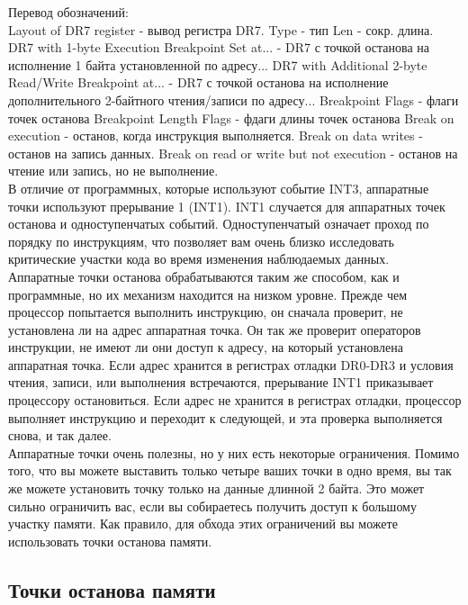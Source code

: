 \documentclass[12pt, a4paper, oneside]{book}
\begin{document}
Перевод обозначений:\\

    Layout of DR7 register - вывод регистра DR7.
    Type - тип
    Len - сокр. длина.
    DR7 with 1-byte Execution Breakpoint Set at... - DR7 с точкой останова на исполнение 1 байта установленной по адресу...
    DR7 with Additional 2-byte Read/Write Breakpoint at... - DR7 с точкой останова на исполнение дополнительного 2-байтного чтения/записи по адресу...
    Breakpoint Flags - флаги точек останова
    Breakpoint Length Flags - фдаги длины точек останова
    Break on execution - останов, когда инструкция выполняется.
    Break on data writes - останов на запись данных.
    Break on read or write but not execution - останов на чтение или запись, но не выполнение.\\


В отличие от программных, которые используют событие INT3, аппаратные точки используют прерывание 1 (INT1). INT1 случается для аппаратных точек останова и одноступенчатых событий. Одноступенчатый означает проход по порядку по инструкциям, что позволяет вам очень близко исследовать критические участки кода во время изменения наблюдаемых данных.\\

Аппаратные точки останова обрабатываются таким же способом, как и программные, но их механизм находится на низком уровне. Прежде чем процессор попытается выполнить инструкцию, он сначала проверит, не установлена ли на адрес аппаратная точка. Он так же проверит операторов инструкции, не имеют ли они доступ к адресу, на который установлена аппаратная точка. Если адрес хранится в регистрах отладки DR0-DR3 и условия чтения, записи, или выполнения встречаются, прерывание INT1 приказывает процессору остановиться. Если адрес не хранится в регистрах отладки, процессор выполняет инструкцию и переходит к следующей, и эта проверка выполняется снова, и так далее.\\

Аппаратные точки очень полезны, но у них есть некоторые ограничения. Помимо того, что вы можете выставить только четыре ваших точки в одно время, вы так же можете установить точку только на данные длинной 2 байта. Это может сильно ограничить вас, если вы собираетесь получить доступ к большому участку памяти. Как правило, для обхода этих ограничений вы можете использовать точки останова памяти.\\

\subsection{Точки останова памяти}
\end{document}
